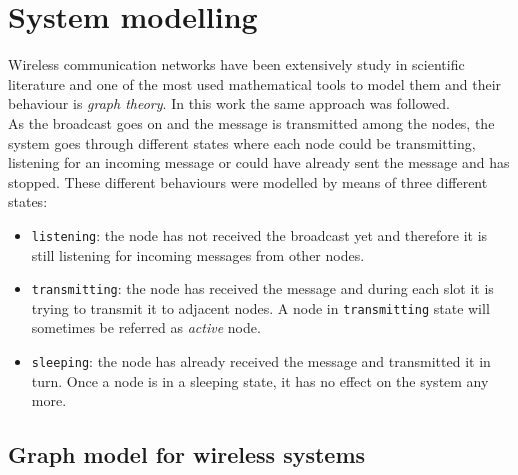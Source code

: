 %
\chapter{System modelling}\label{modelling}
Wireless communication networks have been extensively study in scientific literature and one of the most used mathematical tools to model them and their behaviour is \textit{graph theory}.
In this work the same approach was followed.\\
As the broadcast goes on and the message is transmitted among the nodes, the system goes through different states where each node could be transmitting, listening for an incoming message or could have already sent the message and has stopped.
These different behaviours were modelled by means of three different states:
\begin{itemize}
	\item
	\texttt{listening}: the node has not received the broadcast yet and therefore it is still listening for incoming messages from other nodes.
	\item
	\texttt{transmitting}: the node has received the message and during each slot it is trying to transmit it to adjacent nodes. A node in \texttt{transmitting} state will sometimes be referred as \textit{active} node.
	\item
	\texttt{sleeping}: the node has already received the message and transmitted it in turn. Once a node is in a sleeping state, it has no effect on the system any more.
\end{itemize}


\section{Graph model for wireless systems}

